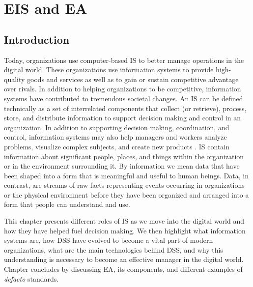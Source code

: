 \documentclass[12pt,a4paper,final,twoside,onecolumn,titlepage]{book}
\begin{document}
\mainmatter

\chapter{EIS and EA}
\label{EISandEA}
\section{Introduction}
Today, organizations use computer-based \gls{IS} to better manage operations in the digital world. These organizations use information systems to provide high-quality goods and services as well as to gain or sustain competitive advantage over rivals. In addition to helping organizations to be competitive, information systems have contributed to tremendous societal changes. An \gls{IS} can be defined technically as a set of interrelated components that collect (or retrieve), process, store, and distribute information to support decision making and control in an organization. In addition to supporting decision making, coordination, and control, information systems may also help managers and workers analyze problems, visualize complex subjects, and create new products \cite{MIS-DigitalFirm}. \gls{IS} contain information about significant people, places, and things within the organization or in the environment surrounding it. By information we mean data that have been shaped into a form that is meaningful and useful to human beings. Data, in contrast, are streams of raw facts representing events occurring in organizations or the physical environment before they have been organized and arranged into a form that people can understand and use. 

This chapter presents different roles of \gls{IS} as we move into the digital world and how they have helped fuel decision making. We then highlight what information systems are, how \gls{DSS} have evolved to become a vital part of modern organizations, what are the main technologies behind \gls{DSS}, and why this understanding is necessary to become an effective manager in the digital world. Chapter concludes by discussing \gls{EA}, its components, and different examples of \textit{defacto} standards.
\end{document}
